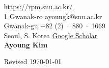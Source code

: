 \documentclass{cv} %
\newcommand\koronly[1]{\ifthenelse{\boolean{kor}}{#1}}
\begin{document}
 \hfill \href{https://rpm.snu.ac.kr/}{https://rpm.snu.ac.kr/}\\
1 Gwanak-ro \hfill ayoungk@snu.ac.kr\\
Gwanak-gu \hfill +82 (2)~$\cdot$~880~$\cdot$~1669\\
Seoul, S. Korea \hfill \href{https://scholar.google.com/citations?user=7yveufgAAAAJ&hl=en}{Google Scholar}\\

\hfil{\namesize\bf Ayoung Kim}\hfil

%





\koronly{}


%
%



%
%



\vspace{0.5in}
\hfill Revised \today
\end{document}
